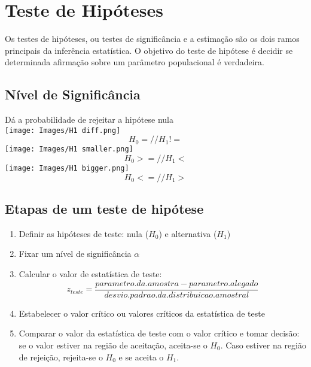 \documentclass[ ]{article}
\begin{document}
\section{Teste de Hipóteses}
	Os testes de hipóteses, ou testes de significância e a estimação são os dois ramos principais da inferência estatística. O objetivo do teste de hipótese é decidir se determinada afirmação sobre um parâmetro populacional é verdadeira.
\subsection{Nível de Significância}
	 Dá a probabilidade de rejeitar a hipótese nula\\
	 
	 \texttt{[image: Images/H1 diff.png]}
	 $$H_0 = // H_1 !=$$
	  \texttt{[image: Images/H1 smaller.png]}
	  $$H_0>= // H_1 <$$
	   \texttt{[image: Images/H1 bigger.png]}
	   $$H_0<= // H_1 >$$
\subsection{Etapas de um teste de hipótese}
	\begin{enumerate}
		\item Definir as hipóteses de teste: nula ($H_0$) e alternativa ($H_1$)
		\item Fixar um nível de significância $\alpha$
		\item Calcular o valor de estatística de teste:
		$$z_{teste}=\dfrac{parametro.da.amostra - parametro.alegado}{desvio.padrao.da.distribuicao.amostral}$$
		\item Estabelecer o valor crítico ou valores críticos da estatística de teste
		\item Comparar o valor da estatística de teste  com o valor crítico e tomar decisão: se o valor estiver na região de aceitação, aceita-se o $H_0$. Caso estiver na região de rejeição, rejeita-se o $H_0$ e se aceita o $H_1$.
	\end{enumerate}
\end{document}
